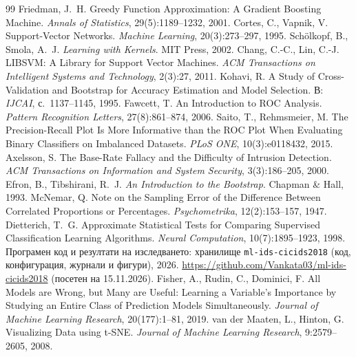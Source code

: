 \begin{thebibliography}{99}
 Friedman, J.~H. Greedy Function Approximation: A Gradient Boosting Machine. \emph{Annals of Statistics}, 29(5):1189--1232, 2001.
 Cortes, C., Vapnik, V. Support-Vector Networks. \emph{Machine Learning}, 20(3):273--297, 1995.
 Schölkopf, B., Smola, A.~J. \emph{Learning with Kernels}. MIT Press, 2002.
 Chang, C.-C., Lin, C.-J. LIBSVM: A Library for Support Vector Machines. \emph{ACM Transactions on Intelligent Systems and Technology}, 2(3):27, 2011.
 Kohavi, R. A Study of Cross-Validation and Bootstrap for Accuracy Estimation and Model Selection. В: \emph{IJCAI}, с.~1137--1145, 1995.
 Fawcett, T. An Introduction to ROC Analysis. \emph{Pattern Recognition Letters}, 27(8):861--874, 2006.
 Saito, T., Rehmsmeier, M. The Precision-Recall Plot Is More Informative than the ROC Plot When Evaluating Binary Classifiers on Imbalanced Datasets. \emph{PLoS ONE}, 10(3):e0118432, 2015.
 Axelsson, S. The Base-Rate Fallacy and the Difficulty of Intrusion Detection. \emph{ACM Transactions on Information and System Security}, 3(3):186--205, 2000.
 Efron, B., Tibshirani, R.~J. \emph{An Introduction to the Bootstrap}. Chapman \& Hall, 1993.
 McNemar, Q. Note on the Sampling Error of the Difference Between Correlated Proportions or Percentages. \emph{Psychometrika}, 12(2):153--157, 1947.
 Dietterich, T.~G. Approximate Statistical Tests for Comparing Supervised Classification Learning Algorithms. \emph{Neural Computation}, 10(7):1895--1923, 1998.
 Програмен код и резултати на изследването: хранилище \texttt{ml-ids-cicids2018} (код, конфигурация, журнали и фигури), 2026. \url{https://github.com/Vankata03/ml-ids-cicids2018} (посетен на 15.11.2026).
 Fisher, A., Rudin, C., Dominici, F. All Models are Wrong, but Many are Useful: Learning a Variable's Importance by Studying an Entire Class of Prediction Models Simultaneously. \emph{Journal of Machine Learning Research}, 20(177):1--81, 2019.
 van der Maaten, L., Hinton, G. Visualizing Data using t-SNE. \emph{Journal of Machine Learning Research}, 9:2579--2605, 2008.
\end{thebibliography}
\endgroup
